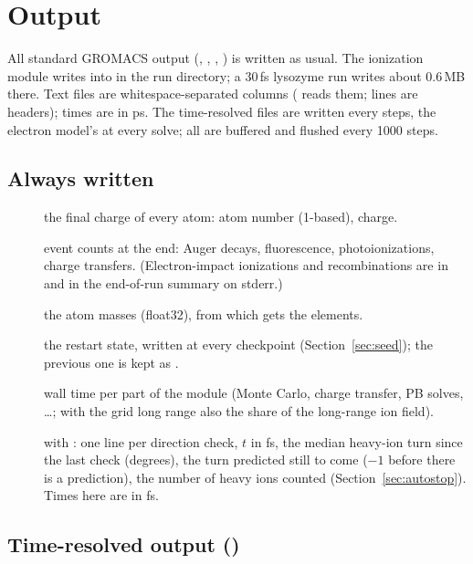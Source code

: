 \chapter{Output}
\label{ch:output}

All standard GROMACS output (, , , ) is written as usual.
The ionization module writes into  in the run directory; a 30\,fs lysozyme run writes about
0.6\,MB there.
Text files are whitespace-separated columns ( reads them; \code{\#} lines are headers); times are in
ps.
The time-resolved files are written every  steps, the electron model's at every solve; all are
buffered and flushed every 1000 steps.

\section{Always written}

\begin{description}
  \item[] the final charge of every atom: atom number (1-based), charge.
  \item[] event counts at the end: Auger decays, fluorescence, photoionizations, charge
    transfers.
    (Electron-impact ionizations and recombinations are in  and in the end-of-run summary
    on stderr.)
  \item[] the atom masses (float32), from which  gets the elements.
  \item[] the restart state, written at every checkpoint (Section~\ref{sec:seed}); the
    previous one is kept as .
  \item[] wall time per part of the module (Monte Carlo, charge transfer, PB solves, \ldots;
    with the grid long range also the share of the long-range ion field).
  \item[] with : one line per direction check, $t$ in fs, the median
    heavy-ion turn since the last check (degrees), the turn predicted still to come ($-1$ before there is a
    prediction), the number of heavy ions counted (Section~\ref{sec:autostop}). Times here are in fs.
\end{description}

\section{Time-resolved output ()}

